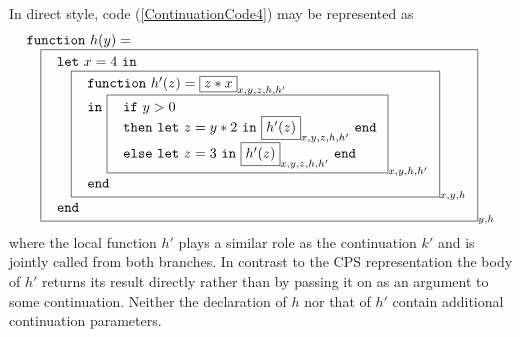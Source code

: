 In direct style, code (\ref{ContinuationCode4}) may be represented as
\begin{equation}
\label{DirectStyleCode1}
\begin{array}{l}
\mathtt{function}\ h (y) =\\
\quad
  \fbox{
    $\begin{array}{l}
       \mathtt{let}\ x=4\ \mathtt{in} \\
       \quad \fbox{
               $\begin{array}{l}
                  \mathtt{function}\ h' (z) = \fbox{$z*x$}_{x,y,z,h,h'} \\
                  \mathtt{in}\
                    \fbox{
                     $\begin{array}[t]{l}
                        \mathtt{if}\ y>0\\
                        \mathtt{then\ let}\ z = y*2\ \mathtt{in}\ 
                              \fbox{$h'(z)$}_{x,y,z,h,h'}\ \mathtt{end}\\
                        \mathtt{else\ let}\ z = 3\ \mathtt{in}\ 
                              \fbox{$h'(z)$}_{x,y,z,h,h'}\ \mathtt{end}
                      \end{array}$}_{x,y,h,h'}\\
                  \mathtt{end}
                \end{array}$}_{x,y,h}\\
       \mathtt{end}
     \end{array}$}_{y, h}
\end{array}
\end{equation}
where the local function $h'$ plays a similar role as the continuation
$k'$ and is jointly called from both branches. In contrast to the CPS
representation the body of $h'$ returns its result directly rather
than by passing it on as an argument to some continuation. Neither the
declaration of $h$ nor that of $h'$ contain additional continuation
parameters.

